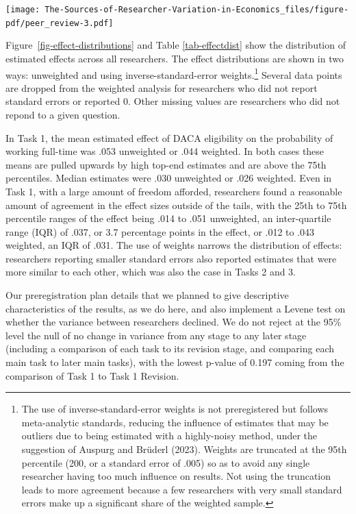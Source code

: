 \documentclass[
  letterpaper,
  DIV=11,
  numbers=noendperiod]{scrartcl}
\begin{document}
\texttt{[image: The-Sources-of-Researcher-Variation-in-Economics\_files/figure-pdf/peer\_review-3.pdf]}

Figure~\ref{fig-effect-distributions} and Table \ref{tab-effectdist}
show the distribution of estimated effects across all researchers. The
effect distributions are shown in two ways: unweighted and using
inverse-standard-error weights.\footnote{The use of
  inverse-standard-error weights is not preregistered but follows
  meta-analytic standards, reducing the influence of estimates that may
  be outliers due to being estimated with a highly-noisy method, under
  the suggestion of Auspurg and Brüderl (2023). Weights are truncated at
  the 95th percentile (200, or a standard error of .005) so as to avoid
  any single researcher having too much influence on results. Not using
  the truncation leads to more agreement because a few researchers with
  very small standard errors make up a significant share of the weighted
  sample.} Several data points are dropped from the weighted analysis
for researchers who did not report standard errors or reported 0. Other
missing values are researchers who did not repond to a given question.

In Task 1, the mean estimated effect of DACA eligibility on the
probability of working full-time was .053 unweighted or .044 weighted.
In both cases these means are pulled upwards by high top-end estimates
and are above the 75th percentiles. Median estimates were .030
unweighted or .026 weighted. Even in Task 1, with a large amount of
freedom afforded, researchers found a reasonable amount of agreement in
the effect sizes outside of the tails, with the 25th to 75th percentile
ranges of the effect being .014 to .051 unweighted, an inter-quartile
range (IQR) of .037, or 3.7 percentage points in the effect, or .012 to
.043 weighted, an IQR of .031. The use of weights narrows the
distribution of effects: researchers reporting smaller standard errors
also reported estimates that were more similar to each other, which was
also the case in Tasks 2 and 3.

Our preregistration plan details that we planned to give descriptive
characteristics of the results, as we do here, and also implement a
Levene test on whether the variance between researchers declined. We do
not reject at the 95\% level the null of no change in variance from any
stage to any later stage (including a comparison of each task to its
revision stage, and comparing each main task to later main tasks), with
the lowest p-value of 0.197 coming from the comparison of Task 1 to Task
1 Revision.
\end{document}
